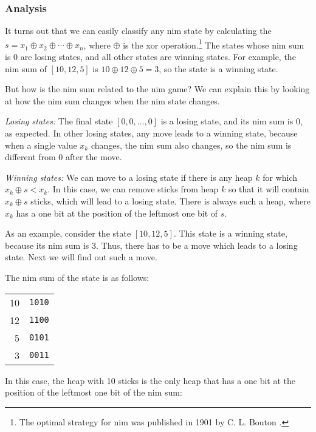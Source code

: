 \subsubsection{Analysis}

It turns out that we can easily classify
any nim state by calculating
the  $s = x_1 \oplus x_2 \oplus \cdots \oplus x_n$,
where $\oplus$ is the xor operation.\footnote{The optimal strategy
    for nim was published in 1901 by C. L. Bouton \cite{bou01}.}
The states whose nim sum is 0 are losing states,
and all other states are winning states.
For example, the nim sum of
$[10,12,5]$ is $10 \oplus 12 \oplus 5 = 3$,
so the state is a winning state.

But how is the nim sum related to the nim game?
We can explain this by looking at how the nim
sum changes when the nim state changes.

\textit{Losing states:}
The final state $[0,0,\ldots,0]$ is a losing state,
and its nim sum is 0, as expected.
In other losing states, any move leads to
a winning state, because when a single value $x_k$ changes,
the nim sum also changes, so the nim sum
is different from 0 after the move.

\textit{Winning states:}
We can move to a losing state if
there is any heap $k$ for which $x_k \oplus s < x_k$.
In this case, we can remove sticks from
heap $k$ so that it will contain $x_k \oplus s$ sticks,
which will lead to a losing state.
There is always such a heap, where $x_k$
has a one bit at the position of the leftmost
one bit of $s$.

As an example, consider the state $[10,12,5]$.
This state is a winning state,
because its nim sum is 3.
Thus, there has to be a move which
leads to a losing state.
Next we will find out such a move.

The nim sum of the state is as follows:

\begin{center}
    \begin{tabular}{r|r}
        10 & \texttt{1010} \\
        12 & \texttt{1100} \\
        5  & \texttt{0101} \\
        \hline
        3  & \texttt{0011} \\
    \end{tabular}
\end{center}

In this case, the heap with 10 sticks
is the only heap that has a one bit
at the position of the leftmost
one bit of the nim sum:

